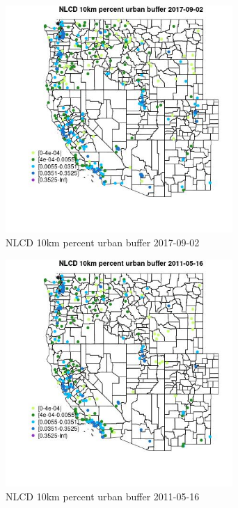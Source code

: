 \begin{figure} 
\centering  
\includegraphics[width=0.77\textwidth]{Code_Outputs/Report_ML_input_PM25_Step4_part_e_de_duplicated_aves_compiled_2019-05-20wNAs_MapObsNLCD_10km_percent_urban_buffer2017-09-02.jpg} 
\caption{\label{fig:Report_ML_input_PM25_Step4_part_e_de_duplicated_aves_compiled_2019-05-20wNAsMapObsNLCD_10km_percent_urban_buffer2017-09-02}NLCD 10km percent urban buffer 2017-09-02} 
\end{figure} 
 

\begin{figure} 
\centering  
\includegraphics[width=0.77\textwidth]{Code_Outputs/Report_ML_input_PM25_Step4_part_e_de_duplicated_aves_compiled_2019-05-20wNAs_MapObsNLCD_10km_percent_urban_buffer2011-05-16.jpg} 
\caption{\label{fig:Report_ML_input_PM25_Step4_part_e_de_duplicated_aves_compiled_2019-05-20wNAsMapObsNLCD_10km_percent_urban_buffer2011-05-16}NLCD 10km percent urban buffer 2011-05-16} 
\end{figure} 
 

